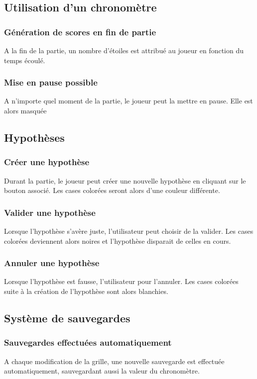 \documentclass{report}
\begin{document}
    \subsection{Utilisation d'un chronomètre}
			\subsubsection{Génération de scores en fin de partie}
				A la fin de la partie, un nombre d'étoiles est attribué au joueur en fonction du temps écoulé.
			\subsubsection{Mise en pause possible}
				A n'importe quel moment de la partie, le joueur peut la mettre en pause. Elle est alors masquée
	
	\subsection{Hypothèses}
		\subsubsection{Créer une hypothèse}
			Durant la partie, le joueur peut créer une nouvelle hypothèse en cliquant sur le bouton associé. Les cases colorées seront alors d'une couleur différente.
		\subsubsection{Valider une hypothèse}
			Lorsque l'hypothèse s'avère juste, l'utilisateur peut choisir de la valider. Les cases colorées deviennent alors noires et l'hypothèse disparait de celles en cours.
		\subsubsection{Annuler une hypothèse}
			Lorsque l'hypothèse est fausse, l'utilisateur pour l'annuler. Les cases colorées suite à la création de l'hypothèse sont alors blanchies.
		
	\subsection{Système de sauvegardes}
		\subsubsection{Sauvegardes effectuées automatiquement}
			A chaque modification de la grille, une nouvelle sauvegarde est effectuée automatiquement, sauvegardant aussi la valeur du chronomètre.
\end{document}

